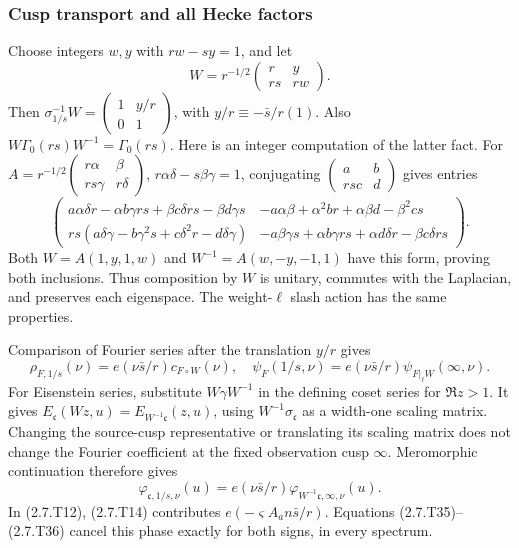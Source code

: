 \subsubsection{Cusp transport and all Hecke factors}\label{p1:sec:t-cusp-transport}

Choose integers $w,y$ with $rw-sy=1$, and let
\[
W=r^{-1/2}\begin{pmatrix}r&y\\rs&rw\end{pmatrix}.
\tag{2.7.T33}\label{p1:eq:2.7.T33}
\]
Then
$\sigma_{1/s}^{-1}W=\begin{pmatrix}1&y/r\\0&1\end{pmatrix}$,
with $y/r\equiv-\bar s/r(1)$. Also $W\Gamma_0(rs)W^{-1}
=\Gamma_0(rs)$. Here is an integer computation of the latter fact.
For
$A=r^{-1/2}\begin{pmatrix}r\alpha&\beta\\rs\gamma&r\delta\end{pmatrix}$,
$r\alpha\delta-s\beta\gamma=1$, conjugating
$\begin{pmatrix}a&b\\rsc&d\end{pmatrix}$ gives entries
\[
\begin{pmatrix}
 a\alpha\delta r-\alpha b\gamma rs+\beta c\delta rs-\beta d\gamma s&
 -a\alpha\beta+\alpha^2br+\alpha\beta d-\beta^2cs\\
 rs(a\delta\gamma-b\gamma^2s+c\delta^2r-d\delta\gamma)&
 -a\beta\gamma s+\alpha b\gamma rs+\alpha d\delta r-\beta c\delta rs
\end{pmatrix}.
\tag{2.7.T34}\label{p1:eq:2.7.T34}
\]
Both $W=A(1,y,1,w)$ and $W^{-1}=A(w,-y,-1,1)$ have this
form, proving both inclusions. Thus composition by $W$ is unitary,
commutes with the Laplacian, and preserves each eigenspace. The
weight-$\ell$ slash action has the same properties.

Comparison of Fourier series after the translation $y/r$ gives
\[
\rho_{F,1/s}(\nu)=e(\nu\bar s/r)c_{F\circ W}(\nu),\quad
\psi_F(1/s,\nu)=e(\nu\bar s/r)\psi_{F|_\ell W}(\infty,\nu).
\tag{2.7.T35}\label{p1:eq:2.7.T35}
\]
For Eisenstein series, substitute $W\gamma W^{-1}$ in the
defining coset series for $\Re z>1$. It gives
$E_{\mathfrak c}(Wz,u)=E_{W^{-1}\mathfrak c}(z,u)$, using
$W^{-1}\sigma_{\mathfrak c}$ as a width-one scaling matrix.
Changing the source-cusp representative or translating its scaling
matrix does not change the Fourier coefficient at the fixed
observation cusp $\infty$.
Meromorphic continuation therefore gives
\[
\varphi_{\mathfrak c,1/s,\nu}(u)
 =e(\nu\bar s/r)\varphi_{W^{-1}\mathfrak c,\infty,\nu}(u).
\tag{2.7.T36}\label{p1:eq:2.7.T36}
\]
In (2.7.T12), (2.7.T14) contributes
$e(-\varsigma A_an\bar s/r)$. Equations (2.7.T35)--(2.7.T36)
cancel this phase exactly for both signs, in every spectrum.

